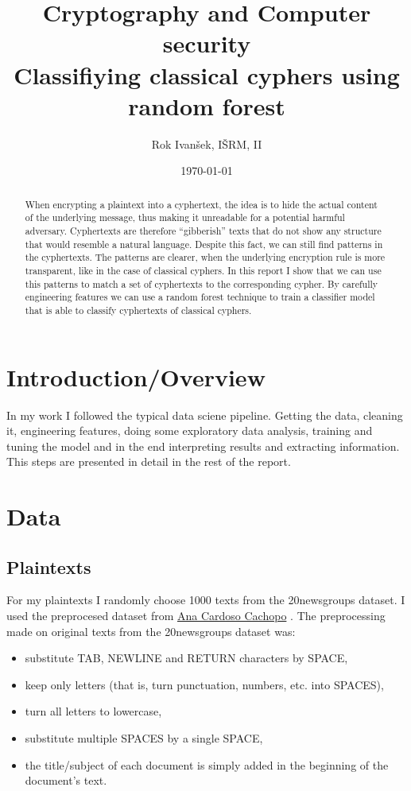 \documentclass[a4paper]{article}
\title{Cryptography and Computer security\\
Classifiying classical cyphers using random forest}
\author{Rok Ivanšek, IŠRM, II}
\date{\today}
\begin{document}
\maketitle


\begin{abstract}
When encrypting a plaintext into a cyphertext, the idea is to hide the actual content of the underlying message, thus making it unreadable for a potential harmful adversary. Cyphertexts are therefore ``gibberish'' texts that do not show any structure that would resemble a natural language. Despite this fact, we can still find patterns in the cyphertexts. The patterns are clearer, when the underlying encryption rule is more transparent, like in the case of classical cyphers. In this report I show that we can use this patterns to match a set of cyphertexts to the corresponding cypher. By carefully engineering features we can use a random forest technique to train a classifier model that is able to classify cyphertexts of classical cyphers.
\end{abstract}

\section*{Introduction/Overview}
In my work I followed the typical data sciene pipeline. Getting the data, cleaning it, engineering features, doing some exploratory data analysis, training and tuning the model and in the end interpreting results and extracting information. This steps are presented in detail in the rest of the report.

\section*{Data}

\subsection*{Plaintexts}
For my plaintexts I randomly choose 1000 texts from the 20newsgroups dataset. I used the preprocesed dataset from \href{http://ana.cachopo.org/datasets-for-single-label-text-categorization}{Ana Cardoso Cachopo} \cite{2007:phd-Ana-Cardoso-Cachopo}. The preprocessing made on original texts from the 20newsgroups dataset was:

\begin{itemize}	
	\setlength\itemsep{-0.2em}
    \item substitute TAB, NEWLINE and RETURN characters by SPACE,
    \item keep only letters (that is, turn punctuation, numbers, etc. into SPACES),
    \item turn all letters to lowercase,
    \item substitute multiple SPACES by a single SPACE,
    \item the title/subject of each document is simply added in the beginning of the document's text.
\end{itemize}
\end{document}

